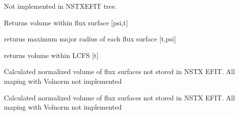 \documentclass[letterpaper,10pt,english]{sphinxmanual}
\begin{document}
\begin{fulllineitems}
\begin{fulllineitems}
\end{fulllineitems}


\begin{fulllineitems}
\label{eqtools:eqtools.NSTXEFIT.NSTXEFITTree.getFluxVol}
Not implemented in NSTXEFIT tree.

Returns volume within flux surface {[}psi,t{]}

\end{fulllineitems}


\begin{fulllineitems}
\label{eqtools:eqtools.NSTXEFIT.NSTXEFITTree.getRmidPsi}
returns maximum major radius of each flux surface {[}t,psi{]}

\end{fulllineitems}


\begin{fulllineitems}
\label{eqtools:eqtools.NSTXEFIT.NSTXEFITTree.getVolLCFS}
returns volume within LCFS {[}t{]}

\end{fulllineitems}


\begin{fulllineitems}
\label{eqtools:eqtools.NSTXEFIT.NSTXEFITTree.rz2volnorm}
Calculated normalized volume of flux surfaces not stored in NSTX EFIT. All maping with Volnorm
not implemented

\end{fulllineitems}


\begin{fulllineitems}
\label{eqtools:eqtools.NSTXEFIT.NSTXEFITTree.psinorm2volnorm}
Calculated normalized volume of flux surfaces not stored in NSTX EFIT. All maping with Volnorm
not implemented

\end{fulllineitems}


\end{fulllineitems}
\end{document}
